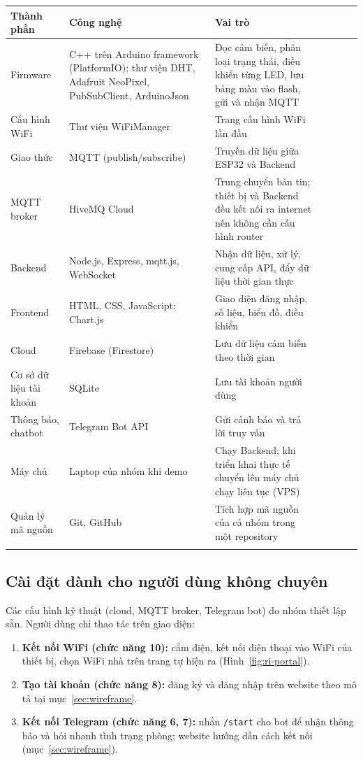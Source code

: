 \documentclass[12pt,a4paper]{article}
\renewcommand{\normalsize}{\fontsize{13pt}{13pt}\selectfont}
\renewcommand{\small}{\fontsize{12pt}{12pt}\selectfont}
\newcommand{\outerline}{\Xhline{0.9pt}}
\begin{document}
\small
\begin{tabularx}{\linewidth}{I L{2.6cm} i L{4.6cm} i Y I}
\outerline
{}\textbf{Thành phần} & \textbf{Công nghệ} & \textbf{Vai trò} \\
\hline
Firmware & C++ trên Arduino framework (PlatformIO); thư viện DHT, Adafruit NeoPixel, PubSubClient, ArduinoJson & Đọc cảm biến, phân loại trạng thái, điều khiển từng LED, lưu bảng màu vào flash, gửi và nhận MQTT \\
\hline
Cấu hình WiFi & Thư viện WiFiManager & Trang cấu hình WiFi lần đầu \\
\hline
Giao thức & MQTT (publish/subscribe) & Truyền dữ liệu giữa ESP32 và Backend \\
\hline
MQTT broker & HiveMQ Cloud & Trung chuyển bản tin; thiết bị và Backend đều kết nối ra internet nên không cần cấu hình router \\
\hline
Backend & Node.js, Express, mqtt.js, WebSocket & Nhận dữ liệu, xử lý, cung cấp API, đẩy dữ liệu thời gian thực \\
\hline
Frontend & HTML, CSS, JavaScript; Chart.js & Giao diện đăng nhập, số liệu, biểu đồ, điều khiển \\
\hline
Cloud & Firebase (Firestore) & Lưu dữ liệu cảm biến theo thời gian \\
\hline
Cơ sở dữ liệu tài khoản & SQLite & Lưu tài khoản người dùng \\
\hline
Thông báo, chatbot & Telegram Bot API & Gửi cảnh báo và trả lời truy vấn \\
\hline
Máy chủ & Laptop của nhóm khi demo & Chạy Backend; khi triển khai thực tế chuyển lên máy chủ chạy liên tục (VPS) \\
\hline
Quản lý mã nguồn & Git, GitHub & Tích hợp mã nguồn của cả nhóm trong một repository \\
\outerline
\end{tabularx}
\normalsize

\subsection{Cài đặt dành cho người dùng không chuyên}
\label{sec:caidat}
Các cấu hình kỹ thuật (cloud, MQTT broker, Telegram bot) do nhóm thiết lập sẵn. Người dùng chỉ thao tác trên giao diện:
\begin{enumerate}
  \item \textbf{Kết nối WiFi (chức năng 10):} cắm điện, kết nối điện thoại vào WiFi của thiết bị, chọn WiFi nhà trên trang tự hiện ra (Hình~\ref{fig:ri-portal}).
  \item \textbf{Tạo tài khoản (chức năng 8):} đăng ký và đăng nhập trên website theo mô tả tại mục~\ref{sec:wireframe}.
  \item \textbf{Kết nối Telegram (chức năng 6, 7):} nhắn \texttt{/start} cho bot để nhận thông báo và hỏi nhanh tình trạng phòng; website hướng dẫn cách kết nối (mục~\ref{sec:wireframe}).
\end{enumerate}
\end{document}
